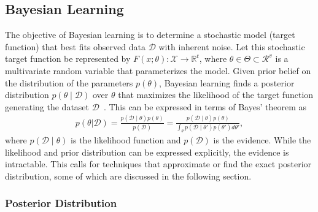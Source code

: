 \subsection{Bayesian Learning}

The objective of Bayesian learning is to determine a stochastic model (target
function) that best fits observed data $\mathcal{D}$ with inherent noise. Let
this stochastic target function be represented by $F(x; \theta) : \mathcal{X}
\rightarrow \mathbb{R}^t$, where $\theta \in \Theta \subset \mathcal{R}^v$ is a
multivariate random variable that parameterizes the model. Given prior belief on
the distribution of the parameters $p(\theta)$, Bayesian learning finds a
posterior distribution $p(\theta \mid \mathcal{D})$ over $\theta$ that maximizes
the likelihood of the target function generating the dataset
$\mathcal{D}$~\cite{bishop2006pattern}. This can be expressed in terms of Bayes'
theorem as 
\begin{align}
  p(\theta | \mathcal{D}) = \frac{p(\mathcal{D} \mid \theta) p(\theta)}{p(\mathcal{D})}
  = \frac{p(\mathcal{D} \mid \theta) p(\theta)}{\int_\theta p(\mathcal{D} \mid \theta') p(\theta') d\theta'},
\end{align}
where $p(\mathcal{D} \mid \theta)$ is the likelihood function and
$p(\mathcal{D})$ is the evidence. While the likelihood and prior distribution
can be expressed explicitly, the evidence is intractable. This calls for
techniques that approximate or find the exact posterior distribution, some of
which are discussed in the following section.

\subsubsection{Posterior Distribution}

